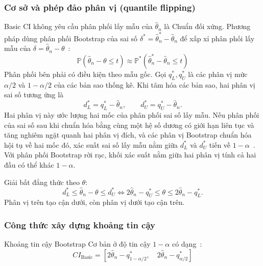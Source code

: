 \documentclass[12pt,a4paper]{article}
\theoremstyle{definition}
\numberwithin{equation}{section}
\begin{document}
	\subsubsection{Cơ sở và phép đảo phân vị (quantile flipping)}
	Basic CI không yêu cầu phân phối lấy mẫu của $\hat{\theta}_n$ là Chuẩn đối xứng. Phương pháp dùng phân phối Bootstrap của sai số $\delta^*=\hat{\theta}_n^*-\hat{\theta}_n$ để xấp xỉ phân phối lấy mẫu của $\delta=\hat{\theta}_n-\theta$~\cite{buithuytrang2026,rizzo2019,davison1997}:
	\begin{equation}
		\mathbb{P}\left(\hat{\theta}_n - \theta \le t\right) \approx \mathbb{P}^*\left(\hat{\theta}_n^* - \hat{\theta}_n \le t\right)
	\end{equation}
	Phân phối bên phải có điều kiện theo mẫu gốc. Gọi $q_L^*,q_U^*$
    là các phân vị mức $\alpha/2$ và $1-\alpha/2$ của các bản sao thống kê.
    Khi tâm hóa các bản sao, hai phân vị sai số tương ứng là
    \[
        d_L^*=q_L^*-\hat\theta_n,\qquad d_U^*=q_U^*-\hat\theta_n.
    \]
    Hai phân vị này ước lượng hai mốc của phân phối sai số lấy mẫu.
    Nếu phân phối của sai số sau khi chuẩn hóa bằng cùng một hệ số dương
    có giới hạn liên tục và tăng nghiêm ngặt quanh hai phân vị đích, và
    các phân vị Bootstrap chuẩn hóa hội tụ về hai mốc đó, xác suất sai số
    lấy mẫu nằm giữa $d_L^*$ và $d_U^*$ tiến về $1-\alpha$~\cite{rizzo2019,davison1997}.
    Với phân phối Bootstrap rời rạc, khối xác suất nằm giữa hai phân vị
    tính cả hai đầu có thể khác $1-\alpha$.

    Giải bất đẳng thức theo $\theta$:
    \[
        d_L^*\le \hat\theta_n-\theta\le d_U^*
        \iff 2\hat\theta_n-q_U^*\le\theta\le 2\hat\theta_n-q_L^*.
    \]
    Phân vị trên tạo cận dưới, còn phân vị dưới tạo cận trên.

    \subsubsection{Công thức xây dựng khoảng tin cậy}
	Khoảng tin cậy Bootstrap Cơ bản ở độ tin cậy $1 - \alpha$ có dạng~\cite{buithuytrang2026,rizzo2019,davison1997}:
	\begin{equation}
		CI_{\text{Basic}} = \left[ 2\hat{\theta}_n - q_{1-\alpha/2}^*, \quad 2\hat{\theta}_n - q_{\alpha/2}^* \right]
	\end{equation}
\end{document}
